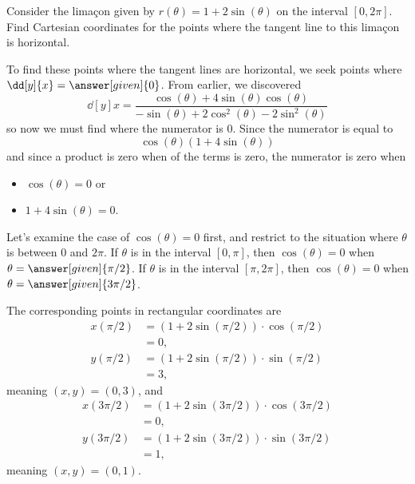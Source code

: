 \documentclass{ximera}
\begin{document}
\begin{example}
  Consider the lima\c{c}on given by $r(\theta) =1+2\sin(\theta)$ on the
  interval $[0,2\pi]$.  Find Cartesian coordinates for the points
  where the tangent line to this lima\c{c}on is horizontal.
\begin{explanation}
  To find these points where the tangent lines are horizontal, we seek
  points where $\dd[y]{x} = \answer[given]{0}$.  From earlier, we discovered
  \[
  \dd[y]{x} =\frac{\cos(\theta) + 4\sin(\theta)\cos(\theta)}{-\sin(\theta) + 2\cos^2(\theta)-2\sin^2(\theta)}
  \]
  so now we must find where the numerator is $0$. Since the numerator is equal to
  \[
  \cos(\theta)(1+ 4\sin(\theta))
  \]
  and since a product is zero when  of the terms is zero,
  the numerator is zero when 
  \begin{itemize}
  \item $\cos(\theta)=0$ or
  \item $1+4\sin(\theta)=0$.
  \end{itemize}

  Let's examine the case of $\cos(\theta) = 0$ first, and restrict to the situation where $\theta$ is between $0$ and $2\pi$.
  If $\theta$ is in the interval $[0,\pi]$, then $\cos(\theta)=0$ when $\theta=\answer[given]{\pi/2}$.
  If $\theta$ is in the interval $[\pi,2\pi]$, then $\cos(\theta)=0$ when $\theta=\answer[given]{3\pi/2}$.

  The corresponding points in rectangular coordinates are
  \begin{align*}
    x(\pi/2) &= \left(1+2\sin(\pi/2)\right)\cdot\cos(\pi/2)\\
    &= 0,\\
    y(\pi/2) &= \left(1+2\sin(\pi/2)\right)\cdot\sin(\pi/2)\\
    &= 3,
  \end{align*}
  meaning $(x,y) = (0,3)$, and
  \begin{align*}
    x(3\pi/2) &= \left(1+2\sin(3\pi/2)\right)\cdot\cos(3\pi/2)\\
    &= 0,\\
    y(3\pi/2) &= \left(1+2\sin(3\pi/2)\right)\cdot\sin(3\pi/2)\\
    &= 1,
  \end{align*}
  meaning $(x,y) = (0,1)$.


\end{explanation}
\end{example}
\end{document}
